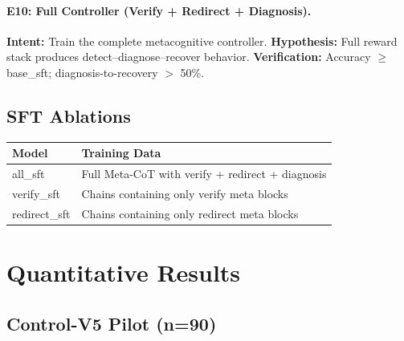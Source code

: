 \documentclass[11pt,a4paper]{article}
\begin{document}
\paragraph{E10: Full Controller (Verify + Redirect + Diagnosis).}
\textbf{Intent:} Train the complete metacognitive controller.
\textbf{Hypothesis:} Full reward stack produces detect--diagnose--recover behavior.
\textbf{Verification:} Accuracy $\geq$ base\_sft; diagnosis-to-recovery $>$ 50\%.

\subsection{SFT Ablations}

\begin{table}[H]
\centering
\begin{tabular}{ll}
\toprule
Model & Training Data \\
\midrule
all\_sft & Full Meta-CoT with verify + redirect + diagnosis \\
verify\_sft & Chains containing only verify meta blocks \\
redirect\_sft & Chains containing only redirect meta blocks \\
\bottomrule
\end{tabular}
\end{table}

\section{Quantitative Results}

\subsection{Control-V5 Pilot (n=90)}
\end{document}
